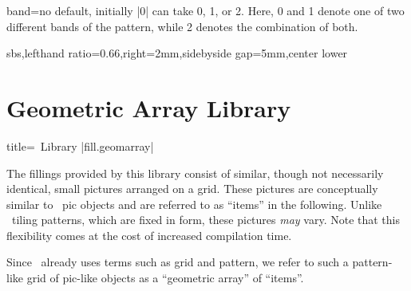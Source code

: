 \documentclass[a4paper,11pt]{article}
\begin{document}
\begin{myvoid}
\clearpage


\begin{docPatternKey}[][doc label=band@rhombus]{band}{=}{no default, initially |0|}
   can take 0, 1, or 2.
  Here, 0 and 1 denote one of two different bands of the pattern,
  while 2 denotes the combination of both.
\begin{dispExample*}{sbs,lefthand ratio=0.66,right=2mm,sidebyside gap=5mm,center lower}

\end{dispExample*}
\end{docPatternKey}


\end{myvoid}

\clearpage
\section{Geometric Array Library}\label{sec:geomarray}%

\begin{dispListing*}{title=\tikzname\ Library |fill.geomarray|}
\usetikzlibrary{fill.geomarray} %
\usepackage{tikzfill.geomarray} %
\end{dispListing*}

The fillings provided by this library consist of similar, though not necessarily
identical, small pictures arranged on a grid. These pictures are conceptually
similar to \tikzname\ pic objects and are referred to as \enquote{items} in the
following. Unlike \tikzname\ tiling patterns, which are fixed in form, these
pictures \emph{may} vary. Note that this flexibility comes at the cost of
increased compilation time.

Since \tikzname\ already uses terms such as grid and pattern, we refer to such a
pattern-like grid of pic-like objects as a \enquote{geometric array} of
\enquote{items}.
\end{document}
